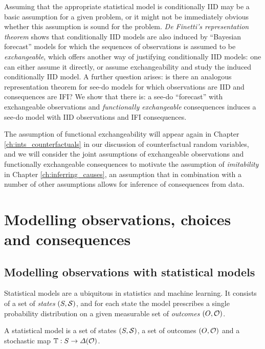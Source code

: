 Assuming that the appropriate statistical model is conditionally IID may be a basic assumption for a given problem, or it might not be immediately obvious whether this assumption is sound for the problem. \emph{De Finetti's representation theorem} shows that conditionally IID models are also induced by ``Bayesian forecast'' models for which the sequences of observations is assumed to be \emph{exchangeable}, which offers another way of justifying conditionally IID models: one can either assume it directly, or assume exchangeability and study the induced conditionally IID model. A further question arises: is there an analogous representation theorem for see-do models for which observations are IID and consequences are IFI? We show that there is: a see-do ``forecast'' with exchangeable observations and \emph{functionally exchangeable} consequences induces a see-do model with IID observations and IFI consequences.

The assumption of functional exchangeability will appear again in Chapter \ref{ch:ints_counterfactuals} in our discussion of counterfactual random variables, and we will consider the joint assumptions of exchangeable observations and functionally exchangeable consequences to motivate the assumption of \emph{imitability} in Chapter \ref{ch:inferring_causes}, an assumption that in combination with a number of other assumptions allows for inference of consequences from data.

\section{Modelling observations, choices and consequences}

\subsection{Modelling observations with statistical models}

Statistical models are a ubiquitous in statistics and machine learning. It consists of a set of \emph{states} $(S,\mathcal{S})$, and for each state the model prescribes a single probability distribution on a given measurable set of \emph{outcomes} $(O,\mathcal{O})$.

\begin{definition}\label{def:statistical model}
A statistical model is a set of states $(S,\mathcal{S})$, a set of outcomes $(O,\mathcal{O})$ and a stochastic map $\mathbb{T}:S\to \Delta(\mathcal{O})$.
\end{definition}

